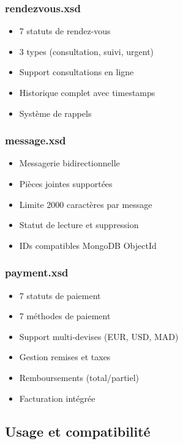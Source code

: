 \documentclass[12pt,a4paper]{article}
\begin{document}
\subsubsection{rendezvous.xsd}
\begin{itemize}
    \item[\checkmark] 7 statuts de rendez-vous
    \item[\checkmark] 3 types (consultation, suivi, urgent)
    \item[\checkmark] Support consultations en ligne
    \item[\checkmark] Historique complet avec timestamps
    \item[\checkmark] Système de rappels
\end{itemize}

\subsubsection{message.xsd}
\begin{itemize}
    \item[\checkmark] Messagerie bidirectionnelle
    \item[\checkmark] Pièces jointes supportées
    \item[\checkmark] Limite 2000 caractères par message
    \item[\checkmark] Statut de lecture et suppression
    \item[\checkmark] IDs compatibles MongoDB ObjectId
\end{itemize}

\subsubsection{payment.xsd}
\begin{itemize}
    \item[\checkmark] 7 statuts de paiement
    \item[\checkmark] 7 méthodes de paiement
    \item[\checkmark] Support multi-devises (EUR, USD, MAD)
    \item[\checkmark] Gestion remises et taxes
    \item[\checkmark] Remboursements (total/partiel)
    \item[\checkmark] Facturation intégrée
\end{itemize}

\subsection{Usage et compatibilité}
\end{document}

